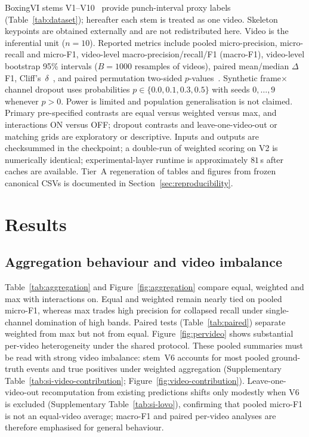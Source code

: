 \documentclass[preprint,12pt,numbers,sort&compress]{elsarticle}
\begin{document}
BoxingVI stems V1--V10~\cite{kumar2025boxingvi} provide punch-interval proxy labels (Table~\ref{tab:dataset}); hereafter each stem is treated as one video.
Skeleton keypoints are obtained externally and are not redistributed here.
Video is the inferential unit ($n{=}10$).
Reported metrics include pooled micro-precision, micro-recall and micro-F1, video-level macro-precision/recall/F1 (macro-F1), video-level bootstrap 95\% intervals ($B{=}1000$ resamples of videos), paired mean/median $\Delta$F1, Cliff's~$\delta$~\cite{cliff1993dominance}, and paired permutation two-sided $p$-values~\cite{efron1994introduction}.
Synthetic frame$\times$channel dropout uses probabilities $p\in\{0.0,0.1,0.3,0.5\}$ with seeds $0,\ldots,9$ whenever $p{>}0$.
Power is limited and population generalisation is not claimed.
Primary pre-specified contrasts are equal versus weighted versus max, and interactions ON versus OFF; dropout contrasts and leave-one-video-out or matching grids are exploratory or descriptive.
Inputs and outputs are checksummed in the checkpoint; a double-run of weighted scoring on V2 is numerically identical; experimental-layer runtime is approximately $81$\,s after caches are available.
Tier~A regeneration of tables and figures from frozen canonical CSVs is documented in Section~\ref{sec:reproducibility}.



\section{Results}
\label{sec:results}

\subsection{Aggregation behaviour and video imbalance}
\label{sec:res-agg}
\label{sec:res-v6}

Table~\ref{tab:aggregation} and Figure~\ref{fig:aggregation} compare equal, weighted and max with interactions on.
Equal and weighted remain nearly tied on pooled micro-F1, whereas max trades high precision for collapsed recall under single-channel domination of high bands.
Paired tests (Table~\ref{tab:paired}) separate weighted from max but not from equal.
Figure~\ref{fig:pervideo} shows substantial per-video heterogeneity under the shared protocol.
These pooled summaries must be read with strong video imbalance: stem~V6 accounts for most pooled ground-truth events and true positives under weighted aggregation (Supplementary Table~\ref{tab:si-video-contribution}; Figure~\ref{fig:video-contribution}).
Leave-one-video-out recomputation from existing predictions shifts only modestly when V6 is excluded (Supplementary Table~\ref{tab:si-lovo}), confirming that pooled micro-F1 is not an equal-video average; macro-F1 and paired per-video analyses are therefore emphasised for general behaviour.
\end{document}
